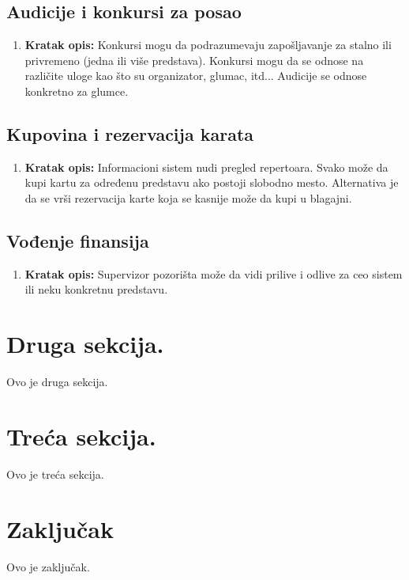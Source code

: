 \documentclass[a4paper]{article}
\begin{document}
\subsection{Audicije i konkursi za posao}
\begin{enumerate}
  \item \textbf{Kratak opis:} Konkursi mogu da podrazumevaju zapošljavanje za stalno ili privremeno
        (jedna ili više predstava). Konkursi mogu da se odnose na različite uloge kao što su
        organizator, glumac, itd... Audicije se odnose konkretno za glumce.
\end{enumerate}
 
\subsection{Kupovina i rezervacija karata}
\begin{enumerate}
  \item \textbf{Kratak opis:} Informacioni sistem nudi pregled repertoara. 
        Svako može da kupi kartu za određenu predstavu ako postoji slobodno mesto.
        Alternativa je da se vrši rezervacija karte koja se kasnije može da kupi u blagajni. 
\end{enumerate}

\subsection{Vođenje finansija}
\begin{enumerate}
  \item \textbf{Kratak opis:} Supervizor pozorišta može da vidi prilive i odlive za ceo sistem ili
        neku konkretnu predstavu. 
\end{enumerate}

\section{Druga sekcija.}
Ovo je druga sekcija.

\section{Treća sekcija.}
Ovo je treća sekcija.

\section{Zaključak}
Ovo je zaključak.

\newpage

\appendix
 

\end{document}
